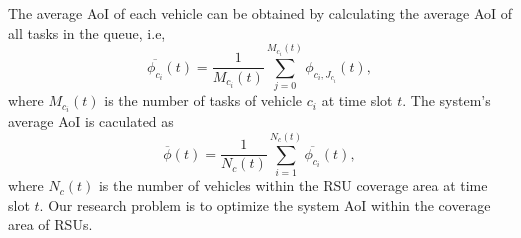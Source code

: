 \documentclass[lettersize,journal,onecolumn]{IEEEtran}
\begin{document}
The average AoI of each vehicle can be obtained by calculating the average AoI of all tasks in the queue, i.e,
\begin{equation}
\overline{{{\phi }_{{{{c}}_{i}}}}}(t)=\frac{1}{{{M}_{{{{c}}_{i}}}}(t)}\sum\limits_{j=0}^{{{M}_{{{{c}}_{i}}}}(t)}{{{\phi }_{{{{c}}_{i}},{{J}_{{{{c}}_{i}}}}}}}(t),
\label{eq8}
\end{equation}
where ${{M}_{{{{c}}_{i}}}}(t)$ is the number of tasks of vehicle ${{{c}}_{i}}$ at time slot $t$. 
The system's average AoI is caculated as 
\begin{equation}
\overline{\phi }(t)=\frac{1}{{{N}_{c}}(t)}\sum\limits_{i=1}^{{{N}_{c}}(t)}{\overline{{{\phi }_{{{{c}}_{i}}}}}(t)},
\label{eq9}
\end{equation}
where ${{N}_{c}}(t)$ is the number of vehicles within the RSU coverage area at time slot $t$. Our research problem is to optimize the system AoI within the coverage area of RSUs. 


\end{document}
